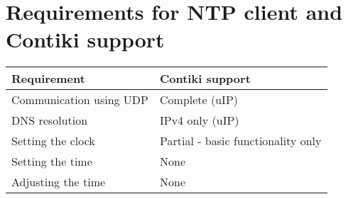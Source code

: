 
\chapter{Requirements for NTP client and Contiki support}
\begin{tabular}{|l|l|}
	\hline
	Requirement & Contiki support \\ \hline
	Communication using UDP & Complete (uIP) \\ \hline
	DNS resolution & IPv4 only (uIP) \\ \hline
	Setting the clock & Partial - basic functionality only\\ \hline
	Setting the time & None \\ \hline
	Adjusting the time & None \\ \hline
\end{tabular}
